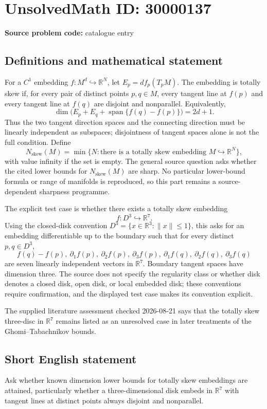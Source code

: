\documentclass[11pt]{article}
\newcommand{\R}{\mathbb{R}}
\begin{document}
\section*{UnsolvedMath ID: 30000137}
\textbf{Source problem code:} catalogue entry
\subsection{Definitions and mathematical statement}
For a \(C^1\) embedding \(f:M^d\hookrightarrow\R^N\), let \(E_p=df_p(T_pM)\). The embedding is totally skew if, for every pair of distinct points \(p,q\in M\), every tangent line at \(f(p)\) and every tangent line at \(f(q)\) are disjoint and nonparallel. Equivalently,
\[
\dim\bigl(E_p+E_q+\operatorname{span}\{f(q)-f(p)\}\bigr)=2d+1.
\]
Thus the two tangent direction spaces and the connecting direction must be linearly independent as subspaces; disjointness of tangent spaces alone is not the full condition. Define
\[
N_{\mathrm{skew}}(M)=\min\{N:\text{there is a totally skew embedding }M\hookrightarrow\R^N\},
\]
with value infinity if the set is empty. The general source question asks whether the cited lower bounds for \(N_{\mathrm{skew}}(M)\) are sharp. No particular lower-bound formula or range of manifolds is reproduced, so this part remains a source-dependent sharpness programme.

The explicit test case is whether there exists a totally skew embedding
\[
f:D^3\hookrightarrow\R^7.
\]
Using the closed-disk convention \(D^3=\{x\in\R^3:\|x\|\leq1\}\), this asks for an embedding differentiable up to the boundary such that for every distinct \(p,q\in D^3\),
\[
f(q)-f(p),\ \partial_1f(p),\ \partial_2f(p),\ \partial_3f(p),\
\partial_1f(q),\ \partial_2f(q),\ \partial_3f(q)
\]
are seven linearly independent vectors in \(\R^7\). Boundary tangent spaces have dimension three. The source does not specify the regularity class or whether disk denotes a closed disk, open disk, or local embedded disk; these conventions require confirmation, and the displayed test case makes its convention explicit.

The supplied literature assessment checked 2026-08-21 says that the totally skew three-disc in \(\R^7\) remains listed as an unresolved case in later treatments of the Ghomi--Tabachnikov bounds.
\subsection{Short English statement}
Ask whether known dimension lower bounds for totally skew embeddings are attained, particularly whether a three-dimensional disk embeds in \(\R^7\) with tangent lines at distinct points always disjoint and nonparallel.
\end{document}
